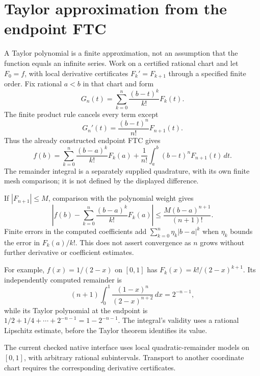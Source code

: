 \section{Taylor approximation from the endpoint FTC}
\label{sec:taylor-from-ftc}
A Taylor polynomial is a finite approximation, not an assumption that the
function equals an infinite series.  Work on a certified rational chart and
let $F_0=f$, with local derivative certificates $F_k'=F_{k+1}$ through a
specified finite order.  Fix rational $a<b$ in that chart and form
\[
 G_n(t)=\sum_{k=0}^{n}\frac{(b-t)^k}{k!}F_k(t).
\]
The finite product rule cancels every term except
\[
 G_n'(t)=\frac{(b-t)^n}{n!}F_{n+1}(t).
\]
Thus the already constructed endpoint FTC gives
\[
 \boxed{f(b)=\sum_{k=0}^{n}\frac{(b-a)^k}{k!}F_k(a)
       +\frac1{n!}\int_a^b(b-t)^nF_{n+1}(t)\,dt.}
\]
The remainder integral is a separately supplied quadrature, with its own
finite mesh comparison; it is not defined by the displayed difference.

If $|F_{n+1}|\le M$, comparison with the polynomial weight gives
\[
 \boxed{\left|f(b)-\sum_{k=0}^{n}\frac{(b-a)^k}{k!}F_k(a)\right|
       \le\frac{M(b-a)^{n+1}}{(n+1)!}.}
\]
Finite errors in the computed coefficients add
$\sum_{k=0}^n\eta_k|b-a|^k$ when $\eta_k$ bounds the error in $F_k(a)/k!$.
This does not assert convergence as $n$ grows without further derivative or
coefficient estimates.

For example, $f(x)=1/(2-x)$ on $[0,1]$ has
$F_k(x)=k!/(2-x)^{k+1}$.  Its independently computed remainder is
\[
 (n+1)\int_0^1\frac{(1-x)^n}{(2-x)^{n+2}}\,dx=2^{-n-1},
\]
while its Taylor polynomial at the endpoint is
$1/2+1/4+\cdots+2^{-n-1}=1-2^{-n-1}$.
The integral's validity uses a rational Lipschitz estimate, before the
Taylor theorem identifies its value.

The current checked native interface uses local quadratic-remainder models
on $[0,1]$, with arbitrary rational subintervals.  Transport to another
coordinate chart requires the corresponding derivative certificates.
